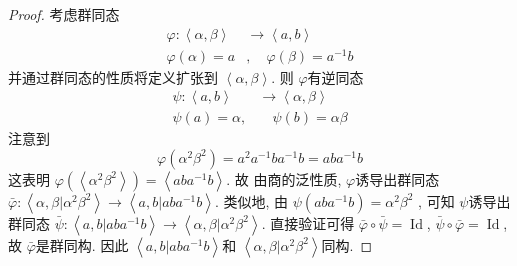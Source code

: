 \documentclass[../main.tex]{subfiles}
\begin{document}
\begin{proof}
    考虑群同态 \[
     \begin{aligned}
     \varphi : \left<\alpha , \beta  \right>&\to \left<a,b \right>\\ 
       \varphi \left( \alpha  \right)= a&,\quad  \varphi \left( \beta  \right)= a^{-1} b
     \end{aligned}
    \]并通过群同态的性质将定义扩张到 \(  \left<\alpha , \beta  \right>  \). 则 \(   \varphi   \)有逆同态 \[
    \begin{aligned}
    \psi  :\left<a,b \right>&\to \left<\alpha ,\beta  \right> \\ 
      \psi  \left( a \right)= \alpha ,&\quad  \psi \left( b \right)= \alpha \beta   
    \end{aligned}
    \]  注意到\[
     \varphi \left( \alpha ^{2}\beta ^{2} \right)= a^{2} a^{-1} ba^{-1} b= aba^{-1} b
    \] 这表明 \(   \varphi   \left( \left<\alpha ^{2}\beta ^{2} \right> \right)= \left<aba^{-1} b \right> \). 故 由商的泛性质, \(   \varphi   \)诱导出群同态 \(   \bar{\varphi}: \left<\alpha ,\beta  |\alpha ^{2}\beta ^{2}\right>\to \left<a,b|aba^{-1} b \right>  \). 类似地, 由 \(  \psi \left( aba^{-1} b \right)= \alpha ^{2}\beta ^{2}   \)     , 可知 \(  \psi   \)诱导出群同态 \(  \bar{\psi}: \left<a,b| aba^{-1} b \right>\to \left<\alpha ,\beta | \alpha ^{2}\beta ^{2} \right>  \). 直接验证可得 \(   \bar{\varphi}\circ \bar{\psi}= \operatorname{Id}  \), \(  \bar{\psi}\circ  \bar{\varphi}= \operatorname{Id}  \), 故 \(   \bar{\varphi}  \)是群同构. 因此 \(  \left<a,b|aba^{-1} b \right>  \)和 \(  \left<\alpha ,\beta | \alpha ^{2}\beta ^{2} \right>  \)同构.       
\end{proof}
\end{document}
